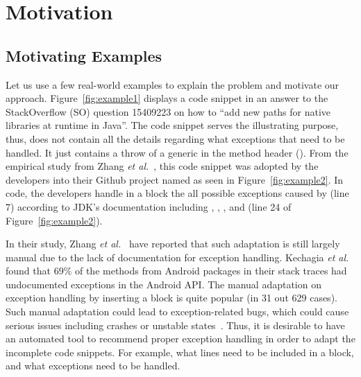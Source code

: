 \section{Motivation}
\label{motiv:sec}

\subsection{Motivating Examples}
\label{examples:sec}



Let us use a few real-world examples to explain the problem and
motivate our approach. Figure~\ref{fig:example1} displays a code
snippet in an answer to the StackOverflow (SO) question 15409223 on
how to ``add new paths for native libraries at runtime in Java''.  The
code snippet serves the illustrating purpose, thus, does not contain
all the details regarding what exceptions that need to be handled. It
just contains a throw of a generic  in the method
header (). From the empirical study from Zhang
{\em et al.}~\cite{zhang-icse19}, this code snippet was adopted by the
developers into their Github project named  as seen in
Figure~\ref{fig:example2}. In  code, the developers
handle in a  block the all possible exceptions caused
by  (line 7)
according to JDK's documentation including
, ,
, and
 (line 24 of
Figure~\ref{fig:example2}).

In their study, Zhang {\em et al.}~\cite{zhang-icse19} have reported
that such adaptation is still largely manual due to the lack of
documentation for exception handling. Kechagia {\em et
  al.}~\cite{kechagia-msr14} found that 69\% of the methods from
Android packages in their stack traces had undocumented exceptions in
the Android API. The manual adaptation on exception handling by
inserting a  block is quite popular (in 31 out 629
cases). Such manual adaptation could lead to exception-related bugs,
which could cause serious issues including crashes or unstable
states~\cite{xrank-fse20}. Thus, it is desirable to have an automated
tool to recommend proper exception handling in order to adapt the
incomplete code snippets. For example, what lines need to be included
in a  block, and what exceptions need to be handled.

